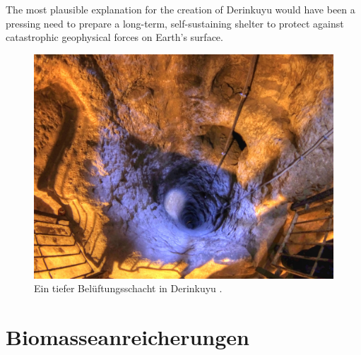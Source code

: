 \documentclass[10pt,twocolumn,letterpaper]{article}
\begin{document}
The most plausible explanation for the creation of Derinkuyu would have been a pressing need to prepare a long-term, self-sustaining shelter to protect against catastrophic geophysical forces on Earth's surface.

\begin{figure}[t]
\begin{center}
   \includegraphics[width=1\linewidth]{derinkuyu-air.jpg}
\end{center}
   \caption{Ein tiefer Belüftungsschacht in Derinkuyu \cite{53}.}
\label{fig:6}
\label{fig:onecol}
\end{figure}


\section{Biomasseanreicherungen}
\end{document}
